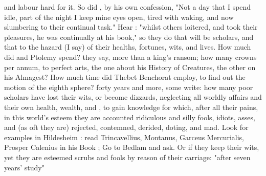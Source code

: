 and labour hard for it. So did \Seneca{}, by his own confession,
 "Not a day that I spend
idle, part of the night I keep mine eyes open, tired with waking, and now
slumbering to their continual task." Hear \Tully{} : "whilst
others loitered, and took their pleasures, he was continually at his book," so
they do that will be scholars, and that to the hazard (I say) of their healths,
fortunes, wits, and lives. How much did \Aristotle{} and Ptolemy spend?  they say, more than a king's ransom; how many crowns per annum,
to perfect arts, the one about his History of Creatures, the other on his
Almagest? How much time did Thebet Benchorat employ, to find out the motion of
the eighth sphere? forty years and more, some write: how many poor scholars
have lost their wits, or become dizzards, neglecting all worldly affairs and
their own health, wealth,  and , to gain knowledge for
which, after all their pains, in this world's esteem they are accounted
ridiculous and silly fools, idiots, asses, and (as oft they are) rejected,
contemned, derided, doting, and mad. Look for examples in Hildesheim
: read Trincavellius,
 Montanus,
 Garceus
 Mercurialis,
 Prosper
Calenius in his Book ;
Go to Bedlam and ask. Or if they keep their wits, yet they are esteemed scrubs
and fools by reason of their carriage: "after seven years' study"


